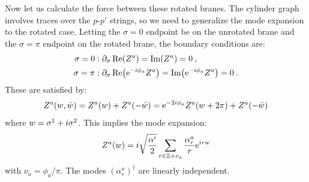 Now let us calculate the force between these rotated branes. The cylinder graph involves traces over the $p$-$p'$ strings, so we need to generalize the mode expansion to the rotated case. Letting the $\sigma = 0$ endpoint be on the unrotated brane and the $\sigma = \pi$ endpoint on the rotated brane, the boundary conditions are:
\begin{subequations} \label{13.4.13}
	\begin{align}
		\sigma = 0 &: \partial_\sigma\operatorname{Re}(Z^a) = \operatorname{Im}(Z^a) = 0 \:, \label{13.4.13a} \\
		\sigma = \pi &: \partial_\sigma\operatorname{Re}\bigl(\mathrm{e}^{-i\phi_a}Z^a\bigr) = \operatorname{Im}\bigl(\mathrm{e}^{-i\phi_a}Z^a\bigr) = 0 \:. \label{13.4.13b}
	\end{align}
\end{subequations}
These are satisfied by:
\begin{equation}
	Z^a(w,\bar{w}) = Z^a(w) + Z^a(-\bar{w}) = \mathrm{e}^{-2i\phi_a}Z^a(w+2\pi) + Z^a(-\bar{w}) \label{13.4.14}
\end{equation}
where $w = \sigma^1 + i\sigma^2$. This implies the mode expansion:
\begin{equation}
	Z^a(w) = i\sqrt{\frac{\alpha'}{2}}\sum_{r\in\mathbb{Z}+\nu_a}\frac{\alpha_r^a}{r}\mathrm{e}^{i r w} \label{13.4.15}
\end{equation}
with $\nu_a = \phi_a/\pi$. The modes $(\alpha_r^a)^\dagger$ are linearly independent.

